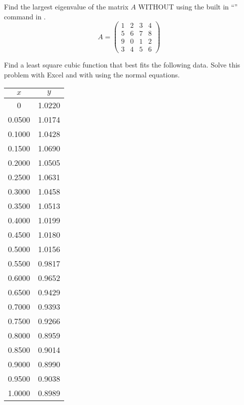 \begin{problem}
    Find the largest eigenvalue of the matrix $A$ WITHOUT using the built in
    ``'' command in \ProgLang.
    \[ A = \begin{pmatrix} 1 & 2 & 3 & 4 \\ 5 & 6 & 7 & 8 \\ 9 & 0 & 1 & 2 \\ 3 & 4 & 5 &
        6 \end{pmatrix} \]
\end{problem}


\begin{problem}
    Find a least square cubic function that best fits the following data. Solve this
    problem with Excel and with \ProgLang using the normal equations.
    \begin{center}
        \begin{tabular}{|c|c|}
            \hline
            $x$ & $y$ \\\hline \hline
            0   & 1.0220\\
            0.0500&   1.0174\\
            0.1000&   1.0428\\
            0.1500&   1.0690\\
            0.2000&   1.0505\\
            0.2500&   1.0631\\
            0.3000&   1.0458\\
            0.3500&   1.0513\\
            0.4000&   1.0199\\
            0.4500&   1.0180\\
            0.5000&   1.0156\\
            0.5500&   0.9817\\
            0.6000&   0.9652\\
            0.6500&   0.9429\\
            0.7000&   0.9393\\
            0.7500&   0.9266\\
            0.8000&   0.8959\\
            0.8500&   0.9014\\
            0.9000&   0.8990\\
            0.9500&   0.9038\\
            1.0000&   0.8989 \\\hline
        \end{tabular}
    \end{center}
\end{problem}



